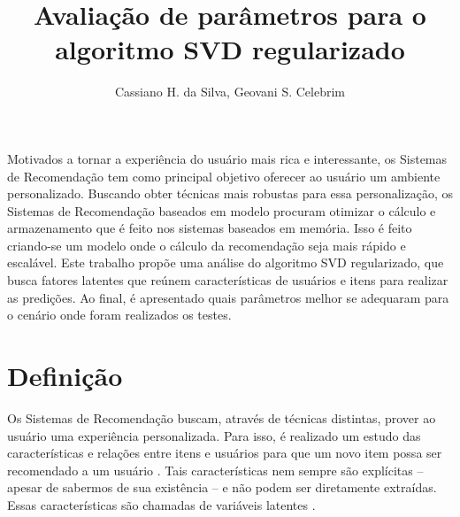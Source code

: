 \documentclass[12pt]{article}
\title{Avaliação de parâmetros para o algoritmo SVD regularizado}
\author{Cassiano H. da Silva\inst{1}, Geovani S. Celebrim\inst{1} }
\begin{document}
 

\maketitle
     
\begin{resumo} 

Motivados a tornar a experiência do usuário mais rica e interessante, os Sistemas de Recomendação tem como principal objetivo oferecer ao usuário um ambiente personalizado. Buscando obter técnicas mais robustas para essa personalização, os Sistemas de Recomendação baseados em modelo procuram otimizar o cálculo e armazenamento que é feito nos sistemas baseados em memória. Isso é feito criando-se um modelo onde o cálculo da recomendação seja mais rápido e escalável. Este trabalho propõe uma análise do algoritmo SVD regularizado, que busca fatores latentes que reúnem características de usuários e itens para realizar as predições. Ao final, é apresentado quais parâmetros melhor se adequaram para o cenário onde foram realizados os testes.


\end{resumo}

\section{Definição}

Os Sistemas de Recomendação buscam, através de técnicas distintas, prover ao usuário uma experiência personalizada. Para isso, é realizado um estudo das características e relações entre itens e usuários para que um novo item possa ser recomendado a um usuário \cite{tail2006future}. Tais características nem sempre são explícitas -- apesar de sabermos de sua existência -- e não podem ser diretamente extraídas. Essas características são chamadas de variáveis latentes \cite{borsboom2003theoretical}.
\end{document}
